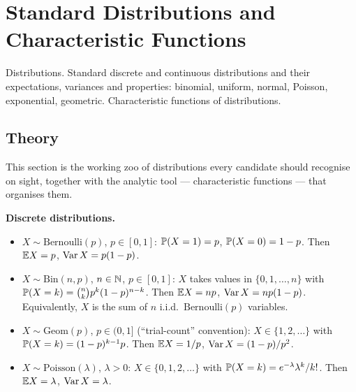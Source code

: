 
\section{Standard Distributions and Characteristic Functions}
\label{sec:1.2.06-standard-distributions}

\begin{ticket}
Distributions. Standard discrete and continuous distributions and their expectations, variances and properties: binomial, uniform, normal, Poisson, exponential, geometric. Characteristic functions of distributions.
\end{ticket}

\subsection*{Theory}

This section is the working zoo of distributions every candidate
should recognise on sight, together with the analytic tool —
characteristic functions — that organises them.

\medskip
\noindent\textbf{Discrete distributions.}

\begin{definition}
\label{def:discrete-distributions}
\hphantom{x}
\begin{itemize}
  \item $X \sim \mathrm{Bernoulli}(p)$, $p \in [0,1]$:
        $\mathbb{P}(X = 1) = p$, $\mathbb{P}(X = 0) = 1 - p$. Then
        $\mathbb{E} X = p$, $\operatorname{Var} X = p(1 - p)$.
  \item $X \sim \mathrm{Bin}(n, p)$, $n \in \mathbb{N}$, $p \in [0, 1]$: $X$
        takes values in $\{0, 1, \dots, n\}$ with
        $\mathbb{P}(X = k) = \binom{n}{k} p^k (1 - p)^{n-k}$. Then
        $\mathbb{E} X = np$, $\operatorname{Var} X = np(1 - p)$. Equivalently, $X$ is the
        sum of $n$ i.i.d.\ $\mathrm{Bernoulli}(p)$ variables.
  \item $X \sim \mathrm{Geom}(p)$, $p \in (0, 1]$ (``trial-count''
        convention): $X \in \{1, 2, \dots\}$ with
        $\mathbb{P}(X = k) = (1 - p)^{k-1} p$. Then $\mathbb{E} X = 1/p$,
        $\operatorname{Var} X = (1 - p)/p^2$.
  \item $X \sim \mathrm{Poisson}(\lambda)$, $\lambda > 0$:
        $X \in \{0, 1, 2, \dots\}$ with
        $\mathbb{P}(X = k) = e^{-\lambda} \lambda^k / k!$. Then
        $\mathbb{E} X = \lambda$, $\operatorname{Var} X = \lambda$.
\end{itemize}
\end{definition}

